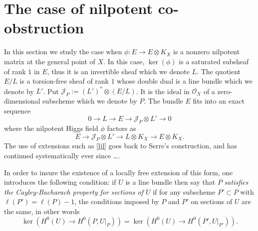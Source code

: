 \documentclass{amsart}
\theoremstyle{plain}
\numberwithin{equation}{section}
\begin{document}
\section{The case of nilpotent co-obstruction}
\label{sec-nilpotent}

In this section we study the case when $\phi : E\rightarrow E\otimes K_X$ is
a nonzero nilpotent matrix at the general point of $X$. In this case, $\ker (\phi )$
is a saturated subsheaf of rank $1$ in $E$, thus it is an invertible sheaf which we denote
$L$. The quotient $E/L$ is a torsion-free sheaf of rank $1$
whose double dual is a line bundle which
we denote by $L'$. Put ${{\mathcal J}} _P:= (L')^{\ast}\otimes (E/L)$. It is the ideal in ${{\mathcal O}} _X$ 
of a zero-dimensional subscheme which we denote by $P$. The bundle $E$ fits into
an exact sequence 
\begin{equation}
\label{ljl}
0\rightarrow L \rightarrow E \rightarrow {{\mathcal J}} _P\otimes L' \rightarrow 0
\end{equation}
where the nilpotent Higgs field $\phi$ factors as 
$$
E\rightarrow {{\mathcal J}} _P\otimes L'\rightarrow L\otimes K_X \rightarrow E\otimes K_X.
$$
The use of extensions such as \eqref{ljl} goes back to Serre's construction, and has continued systematically ever since \cite{ElencwajgForster} \cite{OGradyBasic} \cite{Nijsse} 
\ldots .

In order to insure the existence of a locally free extension of this form, one 
introduces the following condition: if $U$ is a line bundle then 
say that $P$ {\em satisfies the Cayley-Bacharach property for sections
of $U$} if for any subscheme $P'\subset P$ with $\ell (P')=\ell (P)-1$,
the conditions imposed by $P$ and $P'$ on sections of $U$ are the same, in other
words
$$
\ker \left( H^0(U)\rightarrow H^0(P,U|_P) \right)  = 
\ker \left( H^0(U)\rightarrow H^0(P',U|_{P'}) \right) .
$$

 
\end{document}
